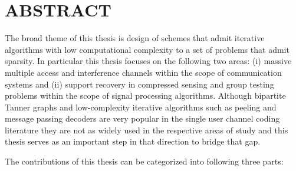 \chapter*{ABSTRACT}

\pagestyle{plain} %
\setcounter{page}{2}

\indent The broad theme of this thesis is design of schemes that admit iterative algorithms with low computational complexity to a set of problems that admit sparsity. In particular this thesis focuses on the following two areas: (i) massive multiple access and interference channels within the scope of communication systems and (ii) support recovery in compressed sensing and group testing problems within the scope of signal processing algorithms. Although bipartite Tanner graphs and low-complexity iterative algorithms such as peeling and message passing decoders are very popular in the single user channel coding literature \cite{richardson2008modern} they are not as widely used in the respective areas of study and this thesis serves as an important step in that direction to bridge that gap. 

The contributions of this thesis can be categorized into following three parts:

